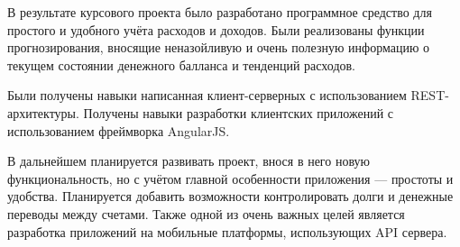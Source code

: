 
В результате курсового проекта было разработано программное средство для простого и 
удобного учёта расходов и доходов. Были реализованы функции прогнозирования, вносящие
неназойливую и очень полезную информацию о текущем состоянии денежного балланса и тенденций 
расходов.

Были получены навыки написанная клиент-серверных с использованием REST-архитектуры. Получены навыки
разработки клиентских приложений с использованием фреймворка AngularJS.

В дальнейшем планируется развивать проект, внося в него новую функциональность, но с учётом
главной особенности приложения --- простоты и удобства. Планируется добавить возможности 
контролировать долги и денежные переводы между счетами. Также одной из очень важных целей является
разработка приложений на мобильные платформы, использующих API сервера. 
